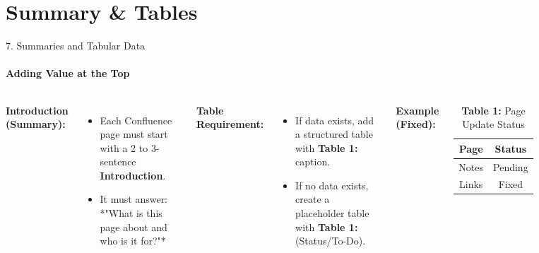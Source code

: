 \documentclass[10pt, aspectratio=169]{beamer}
\begin{document}
	\section{Summary \& Tables}
	\begin{frame}{7. Summaries and Tabular Data}
		\framesubtitle{Adding Value at the Top}
		\begin{columns}[T]
			\textbf{Introduction (Summary):}
			\begin{itemize}
				\item Each Confluence page must start with a 2 to 3-sentence \textbf{Introduction}.
				\item It must answer: *"What is this page about and who is it for?"*
			\end{itemize}
			\pause
			\textbf{Table Requirement:}
			\begin{itemize}
				\item If data exists, add a structured table with \textbf{Table 1:} caption.
				\item If no data exists, create a placeholder table with \textbf{Table 1:} (Status/To-Do).
			\end{itemize}
			\pause
			\textbf{Example (Fixed):}
			\begin{table}[]
				\centering
				\caption{\textbf{Table 1:} Page Update Status}
				\begin{tabular}{|c|c|}
					\hline
					\textbf{Page} & \textbf{Status} \\
					\hline
					Notes & Pending \\
					Links & Fixed \\
					\hline
				\end{tabular}
			\end{table}
		\end{columns}
	\end{frame}
	
\end{document}
